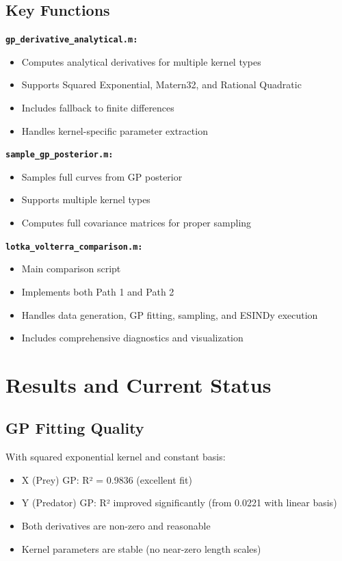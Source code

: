 \documentclass[11pt]{article}
\begin{document}
\subsection{Key Functions}

\textbf{\texttt{gp\_derivative\_analytical.m:}}
\begin{itemize}
    \item Computes analytical derivatives for multiple kernel types
    \item Supports Squared Exponential, Matern32, and Rational Quadratic
    \item Includes fallback to finite differences
    \item Handles kernel-specific parameter extraction
\end{itemize}

\textbf{\texttt{sample\_gp\_posterior.m:}}
\begin{itemize}
    \item Samples full curves from GP posterior
    \item Supports multiple kernel types
    \item Computes full covariance matrices for proper sampling
\end{itemize}

\textbf{\texttt{lotka\_volterra\_comparison.m:}}
\begin{itemize}
    \item Main comparison script
    \item Implements both Path 1 and Path 2
    \item Handles data generation, GP fitting, sampling, and ESINDy execution
    \item Includes comprehensive diagnostics and visualization
\end{itemize}

\section{Results and Current Status}

\subsection{GP Fitting Quality}

With squared exponential kernel and constant basis:
\begin{itemize}
    \item X (Prey) GP: R² = 0.9836 (excellent fit)
    \item Y (Predator) GP: R² improved significantly (from 0.0221 with linear basis)
    \item Both derivatives are non-zero and reasonable
    \item Kernel parameters are stable (no near-zero length scales)
\end{itemize}
\end{document}
